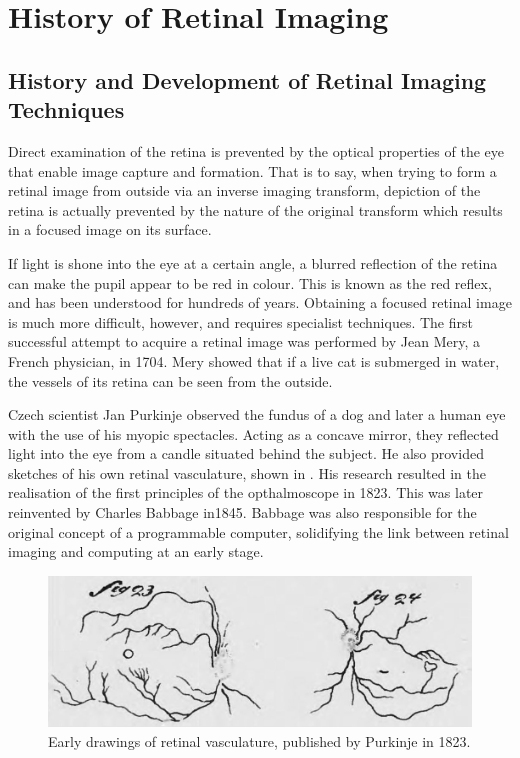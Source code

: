 
\chapter{History of Retinal Imaging}

\label{history_retinal_imaging}


\section{History and Development of Retinal Imaging Techniques}

Direct examination of the retina is prevented by the optical properties of the
eye that enable image capture and formation.  That is to say, when trying to
form a retinal image from outside via an inverse imaging transform, depiction
of the retina is actually prevented by the nature of the original transform which
results in a focused image on its surface.

If light is shone into the eye at a certain angle, a blurred reflection of the
retina can make the pupil appear to be red in colour.  This is known as
the red reflex, and has been understood for hundreds of years.  Obtaining
a focused retinal image is much more difficult, however, and requires
specialist techniques. The first successful attempt to acquire a retinal
image was performed by Jean Mery, a French physician, in 1704.
\cite{valsalva1704aure}  Mery  showed that if a live cat is submerged in
water, the vessels of its retina can be seen from the outside.
\cite{collegeoptometrists}

Czech scientist Jan Purkinje observed the fundus of a dog and later a
human eye with the use of his myopic spectacles.  Acting as a concave
mirror, they reflected light into the eye from a candle situated behind the
subject.  He also provided sketches of his own retinal vasculature, shown
in . His research resulted in the realisation of the
first principles of the opthalmoscope in 1823.  This was later reinvented
by Charles Babbage in1845. \cite{flick1947centenary,keeler1997150}
Babbage was also responsible for the original concept of a programmable
computer, solidifying the link between retinal imaging and computing at an
early stage.\cite{halacy1970charles}

\begin{figure}[htbp]
\centering
  \includegraphics{figures/retinal_vasc_drawings}
\caption{Early drawings of retinal vasculature, published by Purkinje in 1823.\cite{purkinjeje}}
\label{fig:retinal_drawings}
\end{figure}

